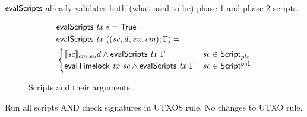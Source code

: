 $\mathsf{evalScripts}$ already validates both (what used to be) phase-1 and phase-2 scripts.

\begin{figure}[htb]
  \begin{align*}
    & \mathsf{evalScripts}~\mathit{tx}~\epsilon = \mathsf{True} \\
    & \mathsf{evalScripts}~\mathit{tx}~((\mathit{sc}, \mathit{d}, \mathit{eu}, \mathit{cm});\Gamma) = \\
      & \begin{cases}
        \llbracket sc \rrbracket_{cm,\mathit{eu}} d \land \mathsf{evalScripts}~\mathit{tx}~\Gamma & \mathit{sc}\in\mathsf{Script}_{plc} \\
        \mathsf{evalTimelock}~\mathit{tx}~\mathit{sc} \land \mathsf{evalScripts}~\mathit{tx}~\Gamma & \mathit{sc}\in\mathsf{Script^{ph1}}
      \end{cases}
  \end{align*}
  \caption{Scripts and their arguments}
  \label{fig:functions:script2}
\end{figure}


Run all scripts AND check signatures in UTXOS rule. No changes to UTXO rule.

